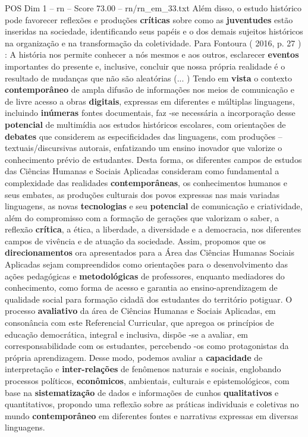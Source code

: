 \begin{textsample}{POS Dim 1 – rn – Score 73.00 – rn/rn\_em\_33.txt}
Além disso, o estudo histórico pode favorecer reflexões e produções \textbf{críticas} sobre como as \textbf{juventudes} estão inseridas na sociedade, identificando seus papéis e o dos demais sujeitos históricos na organização e na transformação da coletividade.
Para Fontoura ( 2016, p. 27 ) : A história nos permite conhecer a nós mesmos e aos outros, esclarecer \textbf{eventos} importantes do presente e, inclusive, concluir que nossa própria realidade é o resultado de mudanças que não são aleatórias (... ) Tendo em \textbf{vista} o contexto \textbf{contemporâneo} de ampla difusão de informações nos meios de comunicação e de livre acesso a obras \textbf{digitais}, expressas em diferentes e múltiplas linguagens, incluindo \textbf{inúmeras} fontes documentais, faz -se necessária a incorporação desse \textbf{potencial} de multimídia aos estudos históricos escolares, com orientações de \textbf{debates} que considerem as especificidades das linguagens, com produções – textuais/discursivas autorais, enfatizando um ensino inovador que valorize o conhecimento prévio de estudantes.
Desta forma, os diferentes campos de estudos das Ciências Humanas e Sociais Aplicadas consideram como fundamental a complexidade das realidades \textbf{contemporâneas}, os conhecimentos humanos e seus embates, as produções culturais dos povos expressas nas mais variadas linguagens, as novas \textbf{tecnologias} e seu \textbf{potencial} de comunicação e criatividade, além do compromisso com a formação de gerações que valorizam o saber, a reflexão \textbf{crítica}, a ética, a liberdade, a diversidade e a democracia, nos diferentes campos de vivência e de atuação da sociedade.
Assim, propomos que os \textbf{direcionamentos} ora apresentados para a Área das Ciências Humanas Sociais Aplicadas sejam compreendidos como orientações para o desenvolvimento das ações pedagógicas e \textbf{metodológicas} de professores, enquanto mediadores do conhecimento, como forma de acesso e garantia ao ensino-aprendizagem de qualidade social para formação cidadã dos estudantes do território potiguar.
O processo \textbf{avaliativo} da área de Ciências Humanas e Sociais Aplicadas, em consonância com este Referencial Curricular, que apregoa os princípios de educação democrática, integral e inclusiva, dispõe -se a avaliar, em corresponsabilidade com os estudantes, percebendo -os como protagonistas da própria aprendizagem.
Desse modo, podemos avaliar a \textbf{capacidade} de interpretação e \textbf{inter-relações} de fenômenos naturais e sociais, englobando processos políticos, \textbf{econômicos}, ambientais, culturais e epistemológicos, com base na \textbf{sistematização} de dados e informações de cunhos \textbf{qualitativos} e quantitativos, propondo uma reflexão sobre as práticas individuais e coletivas no mundo \textbf{contemporâneo} em diferentes fontes e narrativas expressas em diversas linguagens.

\end{textsample}
